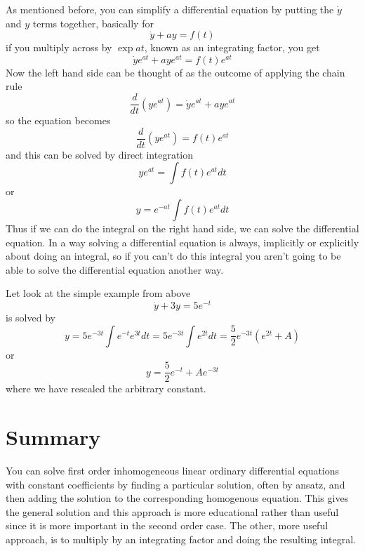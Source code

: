 \documentclass[12pt]{article}
\begin{document}
As mentioned before, you can simplify a differential equation by putting the $\dot{y}$ and $y$ terms together, basically for
\begin{equation}
  \dot{y}+ay=f(t)
\end{equation}
if you multiply across by $\exp{at}$, known as an integrating factor, you get
\begin{equation}
  \dot{y}e^{at}+aye^{at}=f(t)e^{at}
\end{equation}
Now the left hand side can be thought of as the outcome of applying the chain rule
\begin{equation}
  \frac{d}{dt}\left(ye^{at}\right)=\dot{y}e^{at}+aye^{at}
\end{equation}
so the equation becomes
\begin{equation}
  \frac{d}{dt}\left(ye^{at}\right)=f(t)e^{at}
\end{equation}
and this can be solved by direct integration
\begin{equation}
  ye^{at}=\int f(t)e^{at}dt
\end{equation}
or
\begin{equation}
  y=e^{-at}\int f(t)e^{at}dt
\end{equation}
Thus if we can do the integral on the right hand side, we can solve
the differential equation. In a way solving a differential equation is
always, implicitly or explicitly about doing an integral, so if you
can't do this integral you aren't going to be able to solve the
differential equation another way.

Let look at the simple example from above
\begin{equation}
  \dot{y}+3y=5e^{-t}
\end{equation}
is solved by
\begin{equation}
  y=5e^{-3t}\int e^{-t}e^{3t}dt = 5e^{-3t}\int e^{2t}dt = \frac{5}{2}e^{-3t}\left(e^{2t}+A\right)
\end{equation}
or
\begin{equation}
  y=\frac{5}{2}e^{-t}+Ae^{-3t}
\end{equation}
where we have rescaled the arbitrary constant.

\section*{Summary}
You can solve first order inhomogeneous linear ordinary differential
equations with constant coefficients by finding a particular solution,
often by ansatz, and then adding the solution to the corresponding
homogenous equation. This gives the general solution and this approach
is more educational rather than useful since it is more important in
the second order case. The other, more useful approach, is to multiply
by an integrating factor and doing the resulting integral.
\end{document}

